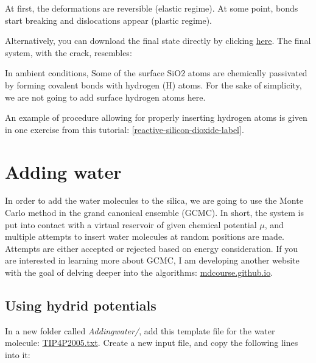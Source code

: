 At first, the deformations
are reversible (elastic regime). At some point, bonds
start breaking and dislocations appear (plastic regime). 

Alternatively, you
can download the final state directly by clicking
\href{../../../../../inputs/level3/water-adsorption-in-silica/Cracking/dilatedSiO.data}{here}. The final system, with the crack, resembles:

\begin{tcolorbox}[colback=mylightblue!5!white,colframe=mylightblue!75!black,title=Passivated silica]
In ambient conditions, Some of the surface SiO2 atoms are chemically
passivated by forming covalent bonds with hydrogen (H)
atoms. For the sake of simplicity, we are not going to
add surface hydrogen atoms here. 

An example of procedure allowing for properly inserting hydrogen atoms is given in one 
exercise from this tutorial: \ref{reactive-silicon-dioxide-label}.
\end{tcolorbox}

\noindent \section{Adding water}

\begin{tcolorbox}[colback=mylightblue!5!white,colframe=mylightblue!75!black,title=About the GCMC method]
In order to add the water molecules to the silica, we are
going to use the Monte Carlo method in the grand canonical
ensemble (GCMC). In short, the system is put into contact
with a virtual reservoir of given chemical potential
$\mu$, and multiple attempts to insert water
molecules at random positions are made. Attempts are
either accepted or rejected based on energy consideration.
If you are interested in learning more about GCMC, I am developing
another website with the goal of delving deeper into the algorithms: \href{https://mdcourse.github.io}{mdcourse.github.io}.
\end{tcolorbox}

\noindent \subsection{Using hydrid potentials}

In a new folder called \textit{Addingwater/}, add this template file
for the water molecule: \href{../../../../../inputs/level3/water-adsorption-in-silica/AddingWater/TIP4P2005.txt}{TIP4P2005.txt}.
Create a new input file, and copy the following lines into it:

